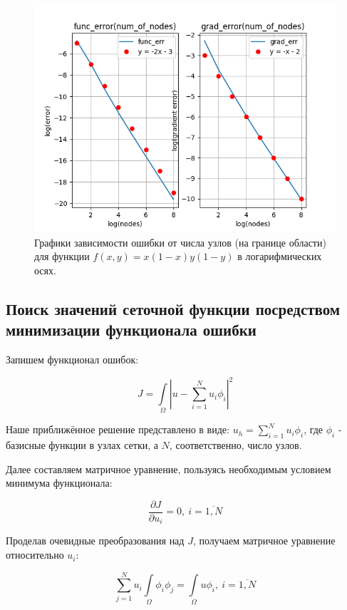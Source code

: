 \documentclass[12pt]{article}
\begin{document}
\begin{figure}[H] \label{fig1}
\centerline{\includegraphics[scale = 0.9]{Figure_3.png}}
\caption{Графики зависимости ошибки от числа узлов (на границе области) 
для функции $f(x, y) = x(1-x)y(1-y)$ в логарифмических осях.}
\end{figure} 

\pagebreak

\subsection{Поиск значений сеточной функции посредством минимизации функционала ошибки}

Запишем функционал ошибок:

\begin{equation}
 J = \int\limits_{\Omega}|u - \sum_{i=1}^N u_i \phi_i|^2
\end{equation}

Наше приближённое решение представлено в виде: $u_h = \sum\limits_{i=1}^N u_i \phi_i$, где $\phi_i$ - базисные функции в узлах сетки, а $N$, соответственно, число узлов.

Далее составляем матричное уравнение, пользуясь необходимым условием минимума функционала:

\begin{equation}
 \dfrac{\partial J}{\partial u_i} = 0, \ i = \overline{1, N}
\end{equation}

Проделав очевидные преобразования над $J$, получаем матричное уравнение относительно $u_i$:

\begin{equation}
 \sum_{j=1}^{N}u_i\int\limits_{\Omega}\phi_i \phi_j = \int\limits_{\Omega} u \phi_i, \
 i = \overline{1, N}
\end{equation}
\end{document}
